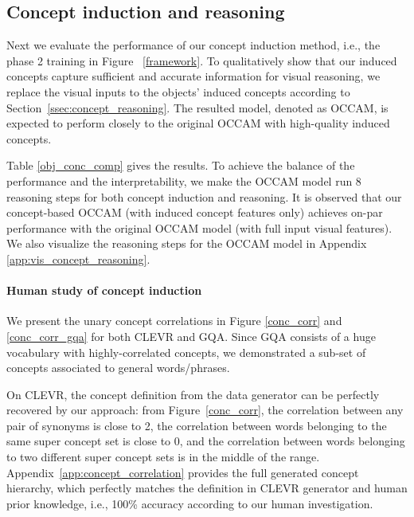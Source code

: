 \documentclass[10pt,twocolumn,letterpaper]{article}
\begin{document}
%
 \subsection{Concept induction and reasoning}
Next we evaluate the performance of our concept induction method, i.e., the phase 2 training in Figure ~\ref{framework}.
To qualitatively show that our induced concepts capture sufficient and accurate information for visual reasoning, we replace the visual inputs to the objects' induced concepts according to Section~\ref{ssec:concept_reasoning}. The resulted model, denoted as OCCAM, is expected to perform closely to the original OCCAM with high-quality induced concepts.

Table \ref{obj_conc_comp} gives the results.
To achieve the balance of the performance and the interpretability, we make the OCCAM model run 8 reasoning steps for both concept induction and reasoning. It is observed that our concept-based OCCAM (with induced concept features only) achieves on-par performance with the original OCCAM model (with full input visual features).
We also visualize the reasoning steps for the OCCAM model in Appendix \ref{app:vis_concept_reasoning}.



\vspace{-3mm}
\paragraph{Human study of concept induction}
We present the unary concept correlations  in Figure \ref{conc_corr} and \ref{conc_corr_gqa} for both CLEVR and GQA. Since GQA consists of a huge vocabulary with highly-correlated concepts, we demonstrated a sub-set of concepts associated to general words/phrases.

On CLEVR, the concept definition from the data generator can be perfectly recovered by our approach: from Figure~\ref{conc_corr},
the correlation between any pair of synonyms is close to 2, the correlation between words belonging to the same super concept set is close to 0, and the correlation between words belonging to two different super concept sets is in the middle of the range. 
Appendix~\ref{app:concept_correlation} provides the full generated concept hierarchy, which perfectly matches the definition in CLEVR generator and human prior knowledge, i.e., 100\% accuracy according to our human investigation.
\end{document}
